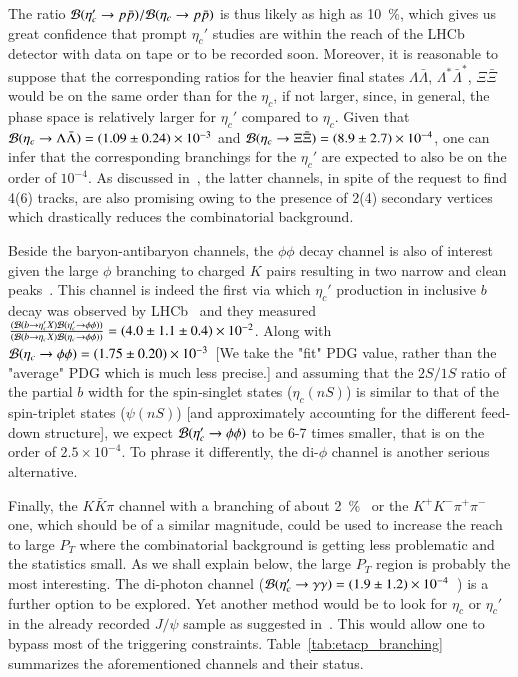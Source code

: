 \documentclass[showpacs,aps,PRL,twocolumn,footinbib,11]{revtex4-1}
\def\etac{\eta_c}
\def\etacp{\eta_c'}
\newcommand{\Br}{{\cal B}}
\newcommand{\ct}[1]{{Table~\ref{#1}}}
\begin{document}
The ratio $\Br (\etacp\to p \bar p)/\Br (\etac\to p \bar p)$ is thus likely as high as 
10~\%, which gives us great confidence that prompt $\etacp$ studies are within 
the reach of the LHCb detector with data on tape or to be recorded soon. Moreover, it is 
reasonable to suppose that the corresponding ratios for the
heavier final states $\Lambda \bar \Lambda$, $\Lambda^* \bar \Lambda^*$,  $\Xi  \bar \Xi$ would
be on the same order than for the $\etac$, if not larger, since, in 
general, the phase space is relatively larger for $\etacp$ compared to $\etac$.
Given that $\Br (\etac\to \Lambda \bar \Lambda)= (1.09\pm 0.24) \times 10^{-3}$ 
and $\Br (\etac\to \Xi  \bar \Xi)= (8.9\pm 2.7) \times 10^{-4}$, one can 
infer that the corresponding branchings for the $\etacp$ are
expected to also be on the order of $10^{-4}$. As discussed in~\cite{Barsuk:2012ic}, 
the latter channels, in spite of the request to find 4(6) tracks, are also promising owing
to the presence of 2(4) secondary vertices which drastically reduces the combinatorial 
background. 

Beside the baryon-antibaryon channels, the $\phi\phi$ decay channel is also of interest
given the large $\phi$ branching to charged $K$ pairs resulting in two narrow and clean 
peaks~\cite{Barsuk:2012ic}. This channel is indeed the first via which $\etacp$ production
in inclusive $b$ decay was observed by LHCb~\cite{Aaij:2017tzn} and they measured
$\frac{(\Br (b\to \etacp X)  \Br (\etacp\to \phi\phi))}{(\Br (b\to \etac X)\Br (\etac\to \phi\phi))}
=(4.0 \pm 1.1 \pm 0.4)\times 10^{-2}$. Along with 
$\Br (\etac \to \phi \phi) = (1.75 \pm 0.20) \times 10^{-3}$~\cite{Olive:2016xmw}[We take
the "fit" PDG value, rather than the "average" PDG which is much less precise.]
and assuming that the $2S/1S$ ratio of the partial $b$ width for the
spin-singlet states ($\eta_c(nS)$) is similar to that of the spin-triplet states ($\psi(nS)$)
[and approximately accounting for the different feed-down structure],
we  expect $\Br (\etacp\to \phi\phi)$ to be 6-7 times smaller, that is on the order
of $2.5 \times 10^{-4}$. To phrase it differently, the di-$\phi$ channel is another serious
alternative.

Finally, the  $K \bar K \pi$ channel with a branching of about 2~\%~\cite{Olive:2016xmw}
or the $K^+ K^- \pi^+ \pi^-$ one, which should be of a similar magnitude, could be used to 
increase the reach to large $P_T$ where
the combinatorial background is getting less problematic and the statistics
small. As we shall explain below, the large $P_T$ region is probably the most interesting.
The di-photon channel ($\Br (\etacp \to \gamma\gamma) = 
(1.9 \pm 1.2) \times 10^{-4}$~\cite{Olive:2016xmw}) is a further option to be 
explored. Yet another method would be to look for $\etac$ or $\etacp$ in the 
already recorded $J/\psi$ sample as suggested in~\cite{Lansberg:2013qka}. 
This would allow one to bypass most of the triggering constraints. 
\ct{tab:etacp_branching} summarizes the aforementioned channels and their status.
\end{document}
